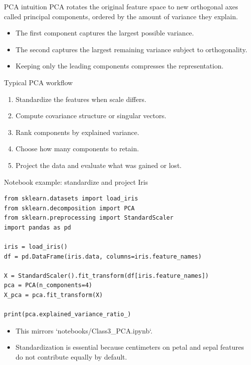 \begin{frame}{PCA intuition}
PCA rotates the original feature space to new orthogonal axes called principal components, ordered by the amount of variance they explain.
\vspace{0.7em}
\begin{itemize}
\item The first component captures the largest possible variance.
\item The second captures the largest remaining variance subject to orthogonality.
\item Keeping only the leading components compresses the representation.
\end{itemize}
\coursefooter
\end{frame}

\begin{frame}{Typical PCA workflow}
\begin{enumerate}
\item Standardize the features when scale differs.
\item Compute covariance structure or singular vectors.
\item Rank components by explained variance.
\item Choose how many components to retain.
\item Project the data and evaluate what was gained or lost.
\end{enumerate}
\coursefooter
\end{frame}

\begin{frame}[fragile]{Notebook example: standardize and project Iris}
\begin{lstlisting}[style=coursepython]
from sklearn.datasets import load_iris
from sklearn.decomposition import PCA
from sklearn.preprocessing import StandardScaler
import pandas as pd

iris = load_iris()
df = pd.DataFrame(iris.data, columns=iris.feature_names)

X = StandardScaler().fit_transform(df[iris.feature_names])
pca = PCA(n_components=4)
X_pca = pca.fit_transform(X)

print(pca.explained_variance_ratio_)
\end{lstlisting}
\begin{itemize}
\item This mirrors `notebooks/Class3_PCA.ipynb`.
\item Standardization is essential because centimeters on petal and sepal features do not contribute equally by default.
\end{itemize}
\coursefooter
\end{frame}

